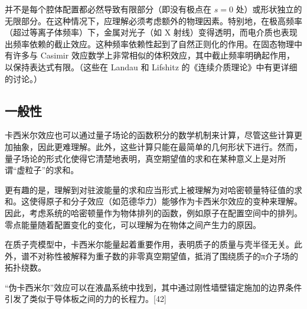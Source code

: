 并不是每个腔体配置都必然导致有限部分（即没有极点在 \( s = 0 \) 处）或形状独立的无限部分。在这种情况下，应理解必须考虑额外的物理因素。特别地，在极高频率（超过等离子体频率）下，金属对光子（如 X 射线）变得透明，而电介质也表现出频率依赖的截止效应。这种频率依赖性起到了自然正则化的作用。在固态物理中有许多与 Casimir 效应数学上非常相似的体积效应，其中截止频率明确起作用，以保持表达式有限。（这些在 Landau 和 Lifshitz 的《连续介质理论》中有更详细的讨论。）
\subsection{一般性}
卡西米尔效应也可以通过量子场论的函数积分的数学机制来计算，尽管这些计算更加抽象，因此更难理解。此外，这些计算只能在最简单的几何形状下进行。然而，量子场论的形式化使得它清楚地表明，真空期望值的求和在某种意义上是对所谓“虚粒子”的求和。

更有趣的是，理解到对驻波能量的求和应当形式上被理解为对哈密顿量特征值的求和。这使得原子和分子效应（如范德华力）能够作为卡西米尔效应的变种来理解。因此，考虑系统的哈密顿量作为物体排列的函数，例如原子在配置空间中的排列。零点能量随着配置变化的变化，可以理解为在物体之间产生力的原因。

在质子壳模型中，卡西米尔能量起着重要作用，表明质子的质量与壳半径无关。此外，谱不对称性被解释为重子数的非零真空期望值，抵消了围绕质子的π介子场的拓扑绕数。

“伪卡西米尔”效应可以在液晶系统中找到，其中通过刚性墙壁锚定施加的边界条件引发了类似于导体板之间的力的长程力。[42]